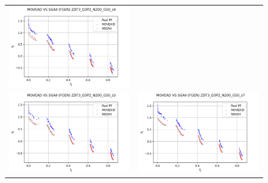 \begin{figure}[H]
\begin{tabular}{c c}
    \includegraphics[scale=0.5]{figures/ZDT3_EOP2_N200_G50_T30/s4_comp.png}\\
    \includegraphics[scale=0.5]{figures/ZDT3_EOP2_N200_G50_T30/s5_comp.png} &
    \includegraphics[scale=0.5]{figures/ZDT3_EOP2_N200_G50_T30/s7_comp.png}\\

\end{tabular}
\end{figure}
